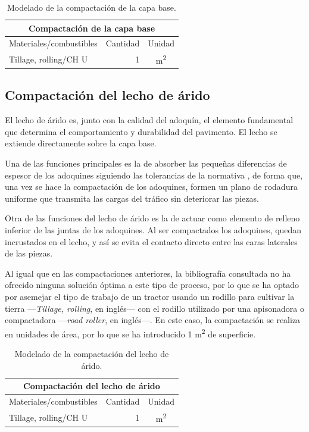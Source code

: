 \begin{table}[!htb]
\centering
\begin{tabular}{p{8cm}rc}
\toprule
\multicolumn{3}{c}{Compactación de la capa base}\\
\midrule
Materiales/combustibles & Cantidad & Unidad\\
\midrule
Tillage, rolling/CH U & 1 & \si{m^2}\\
\bottomrule
\end{tabular}
\caption{Modelado de la compactación de la capa base.}
\label{modeladocapabase}
\end{table}

\subsection{Compactación del lecho de árido}

El lecho de árido es, junto con la calidad del adoquín, el elemento fundamental que determina el comportamiento y durabilidad del pavimento. El lecho se extiende directamente sobre la capa base.

Una de las funciones principales es la de absorber las pequeñas diferencias de espesor de los adoquines siguiendo las tolerancias de la normativa \cite{une1338}, de forma que, una vez se hace la compactación de los adoquines, formen un plano de rodadura uniforme que transmita las cargas del tráfico sin deteriorar las piezas.

Otra de las funciones del lecho de árido es la de actuar como elemento de relleno inferior de las juntas de los adoquines. Al ser compactados los adoquines, quedan incrustados en el lecho, y así se evita el contacto directo entre las caras laterales de las piezas.


Al igual que en las compactaciones anteriores, la bibliografía consultada no ha ofrecido ninguna solución óptima a este tipo de proceso, por lo que se ha optado por asemejar el tipo de trabajo de un tractor usando un rodillo para cultivar la tierra —\textit{Tillage, rolling}, en inglés— con el rodillo utilizado por una apisonadora o compactadora —\textit{road roller}, en inglés—. En este caso, la compactación se realiza en unidades de área, por lo que se ha introducido 1 \si{m^2} de superficie.

\begin{table}[!htb]
\centering
\begin{tabular}{p{8cm}rc}
\toprule
\multicolumn{3}{c}{Compactación del lecho de árido}\\
\midrule
Materiales/combustibles & Cantidad & Unidad\\
\midrule
Tillage, rolling/CH U & 1 & \si{m^2}\\
\bottomrule
\end{tabular}
\caption{Modelado de la compactación del lecho de árido.}
\label{modeladolecho}
\end{table}

